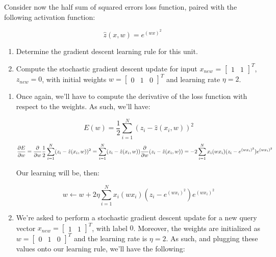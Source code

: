 \documentclass[12pt]{article}
\begin{document}
\begin{enumerate}[leftmargin=\labelsep]
  \begin{tcolorbox}[enhanced jigsaw,colback=bg,boxrule=0pt,arc=1pt,halign=center]
    \item Consider now the half sum of squared errors loss function, paired with
    the following activation function:

    $$
      \hat{z}(x, w) = e^{(w x)^2}
    $$

    \begin{enumerate}
      \item Determine the gradient descent learning rule for this unit.
      \item Compute the stochastic gradient descent update for input $x_{new}$ = $\begin{bmatrix} 1 & 1 \end{bmatrix}^T$,
            $z_{new} = 0$, with initial weights $w = \begin{bmatrix} 0 & 1 & 0 \end{bmatrix}^T$
            and learning rate $\eta = 2$.
    \end{enumerate}
  \end{tcolorbox}

  \begin{enumerate}
    \item {
          Once again, we'll have to compute the derivative of the loss function with
          respect to the weights. As such, we'll have:

          $$
            E(w) = \frac{1}{2} \sum_{i=1}^N (z_i - \hat{z}(x_i, w))^2
          $$
          $$
            \frac{\partial E}{\partial w} = \frac{\partial}{\partial w} \frac{1}{2} \sum_{i=1}^N (z_i - \hat{z}(x_i, w))^2 \\
            = \sum_{i=1}^N (z_i - \hat{z}(x_i, w)) \frac{\partial}{\partial w} (z_i - \hat{z}(x_i, w))
            = -2 \sum_{i=1}^N x_i (w x_i) (z_i - e^{(w x_i)^2}) e^{(w x_i)^2}
          $$

          Our learning will be, then:

          $$
            w \leftarrow w + 2\eta \sum_{i=1}^N x_i (w x_i) (z_i - e^{(w x_i)^2}) e^{(w x_i)^2}
          $$
          }
    \item {
          We're asked to perform a stochastic gradient descent update for a new query
          vector $x_{new} = \begin{bmatrix}1 & 1\end{bmatrix}^T$, with label $0$.
          Moreover, the weights are initialized as $w = \begin{bmatrix}0 & 1 & 0\end{bmatrix}^T$
          and the learning rate is $\eta = 2$. As such, and plugging these values
          onto our learning rule, we'll have the following:

}
\end{enumerate}
\end{enumerate}
\end{document}
